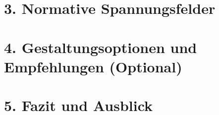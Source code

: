 \section{3. Normative Spannungsfelder }

\section{4. Gestaltungsoptionen und Empfehlungen (Optional)}

\section{5. Fazit und Ausblick}





















